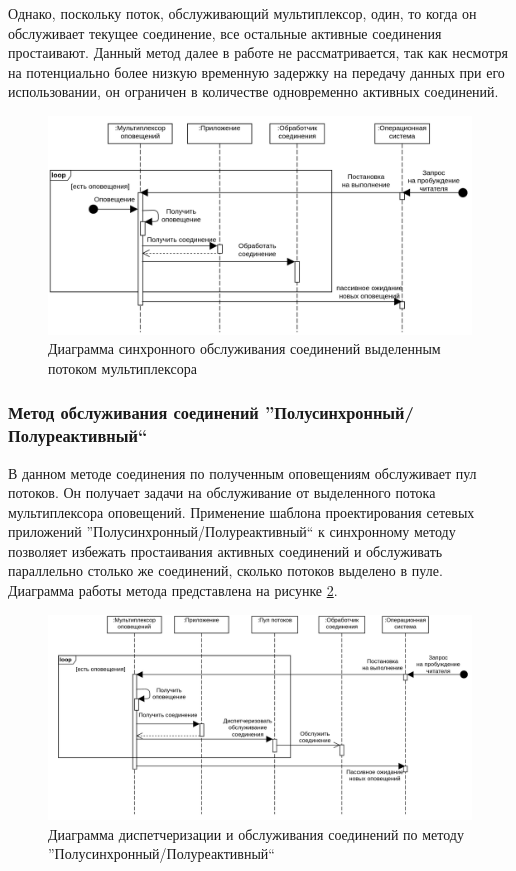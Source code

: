 Однако, поскольку поток, обслуживающий мультиплексор, один, то когда он обслуживает текущее соединение, все остальные активные соединения простаивают. Данный метод далее в работе не рассматривается, так как несмотря на потенциально более низкую временную задержку на передачу данных при его использовании, он ограничен в количестве одновременно активных соединений.

\begin{figure}[!h]
\caption{Диаграмма синхронного обслуживания соединений выделенным потоком мультиплексора}
\label{chapter31:SyncMuxSchema}
\includegraphics[width=\textwidth]{../../graphics/schemes/SyncMuxSequence}
\end{figure}


\subsubsection{Метод обслуживания соединений ''Полусинхронный/Полуреактивный``}\label{chapter31:BlockingHSHA}
В данном методе соединения по полученным оповещениям обслуживает пул потоков. Он получает задачи на обслуживание от выделенного потока мультиплексора оповещений. Применение шаблона проектирования сетевых приложений ''Полусинхронный/Полуреактивный`` \cite{schmidt1995half} к синхронному методу позволяет избежать простаивания активных соединений и обслуживать параллельно столько же соединений, сколько потоков выделено в пуле. Диаграмма работы метода представлена на рисунке \ref{chapter31:HSHAMuxSchema}.

\begin{figure}[!h]
\caption{Диаграмма диспетчеризации и обслуживания соединений по методу ''Полусинхронный/Полуреактивный``}
\label{chapter31:HSHAMuxSchema}
\includegraphics[width=\textwidth]{../../graphics/schemes/HSHAMuxSequence}
\end{figure}

